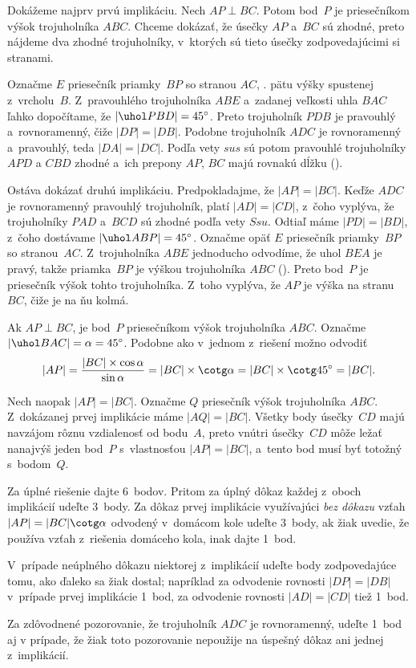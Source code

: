 {%
Dokážeme najprv prvú implikáciu. Nech $AP\perp BC$. Potom bod~$P$ je priesečníkom výšok trojuholníka $ABC$. Chceme dokázať, že úsečky $AP$ a~$BC$ sú zhodné, preto nájdeme dva zhodné trojuholníky, v~ktorých sú tieto úsečky zodpovedajúcimi si stranami.

Označme $E$ priesečník priamky~$BP$ so stranou $AC$, \tj. pätu výšky spustenej z~vrcholu~$B$. Z~pravouhlého trojuholníka $ABE$ a~zadanej veľkosti uhla $BAC$ ľahko dopočítame, že $|\uhol PBD|=45^\circ$. Preto trojuholník $PDB$ je pravouhlý a~rovnoramenný, čiže $|DP|=|DB|$. Podobne trojuholník $ADC$ je rovnoramenný a~pravouhlý, teda $|DA|=|DC|$. Podľa vety $sus$ sú potom pravouhlé trojuholníky $APD$ a $CBD$ zhodné a~ich prepony $AP$, $BC$ majú rovnakú dĺžku (\obr).
%

\smallskip
Ostáva dokázať druhú implikáciu. Predpokladajme, že $|AP|=|BC|$. Keďže $ADC$ je rovnoramenný pravouhlý trojuholník, platí $|AD|=|CD|$, z~čoho vyplýva, že trojuholníky $PAD$ a~$BCD$ sú zhodné podľa vety $Ssu$. Odtiaľ máme $|PD|=|BD|$, z~čoho dostávame $|\uhol ABP|=45^\circ$. Označme opäť $E$ priesečník priamky~$BP$ so stranou~$AC$. Z~trojuholníka $ABE$ jednoducho odvodíme, že uhol $BEA$ je pravý, takže priamka~$BP$ je výškou trojuholníka $ABC$ (). Preto bod~$P$ je priesečník výšok tohto trojuholníka. Z~toho vyplýva, že $AP$ je výška na stranu~$BC$, čiže je na ňu kolmá.

\ineriesenie
Ak $AP\perp BC$, je bod~$P$ priesečníkom výšok trojuholníka $ABC$. Označme $|\uhol BAC|=\alpha=45^\circ$. Podobne ako v~jednom z~riešení
%
možno odvodiť
$$
|AP|=\frac{|BC|\cdot\cos\alpha}{\sin\alpha}=|BC|\cdot\cotg\alpha=|BC|\cdot\cotg 45^\circ=|BC|.
$$

\smallskip
Nech naopak $|AP|=|BC|$. Označme $Q$ priesečník výšok trojuholníka $ABC$. Z~dokázanej prvej implikácie máme $|AQ|=|BC|$. Všetky body úsečky~$CD$ majú navzájom rôznu vzdialenosť od bodu~$A$, preto vnútri úsečky~$CD$ môže ležať nanajvýš jeden bod~$P$ s~vlastnosťou $|AP|=|BC|$, a~tento bod musí byť totožný s~bodom~$Q$.

\nobreak\medskip\petit\noindent
Za úplné riešenie dajte 6~bodov. Pritom za úplný dôkaz každej z~oboch implikácií udeľte 3~body. Za dôkaz prvej implikácie využívajúci {\it bez dôkazu\/} vzťah $|AP|=|BC|\cotg\alpha$ odvodený v~domácom kole udeľte 3~body, ak žiak uvedie, že používa vzťah z~riešenia domáceho kola, inak dajte 1~bod.

V~prípade neúplného dôkazu niektorej z~implikácií udeľte body zodpovedajúce tomu, ako ďaleko sa žiak dostal; napríklad za odvodenie rovnosti $|DP|=|DB|$ v~prípade prvej implikácie 1~bod, za odvodenie rovnosti $|AD|=|CD|$ tiež 1~bod.

Za zdôvodnené pozorovanie, že trojuholník $ADC$ je rovnoramenný, udeľte 1~bod aj v prípade, že žiak toto pozorovanie nepoužije na úspešný dôkaz ani jednej z~implikácií.
\endpetit
\bigbreak}

